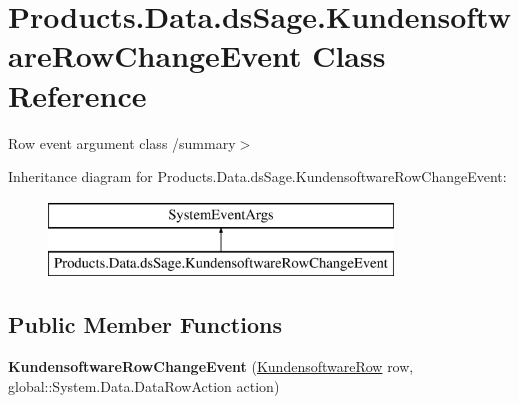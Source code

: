 \hypertarget{class_products_1_1_data_1_1ds_sage_1_1_kundensoftware_row_change_event}{}\section{Products.\+Data.\+ds\+Sage.\+Kundensoftware\+Row\+Change\+Event Class Reference}
\label{class_products_1_1_data_1_1ds_sage_1_1_kundensoftware_row_change_event}


Row event argument class /summary$>$  


Inheritance diagram for Products.\+Data.\+ds\+Sage.\+Kundensoftware\+Row\+Change\+Event\+:\begin{figure}[H]
\begin{center}
\leavevmode
\includegraphics[height=2.000000cm]{class_products_1_1_data_1_1ds_sage_1_1_kundensoftware_row_change_event}
\end{center}
\end{figure}
\subsection*{Public Member Functions}
\begin{DoxyCompactItemize}
\item 
{\bfseries Kundensoftware\+Row\+Change\+Event} (\hyperlink{class_products_1_1_data_1_1ds_sage_1_1_kundensoftware_row}{Kundensoftware\+Row} row, global\+::\+System.\+Data.\+Data\+Row\+Action action)\hypertarget{class_products_1_1_data_1_1ds_sage_1_1_kundensoftware_row_change_event_a858df267f964699e2146d4d49fdbbfc5}{}\label{class_products_1_1_data_1_1ds_sage_1_1_kundensoftware_row_change_event_a858df267f964699e2146d4d49fdbbfc5}

\end{DoxyCompactItemize}
